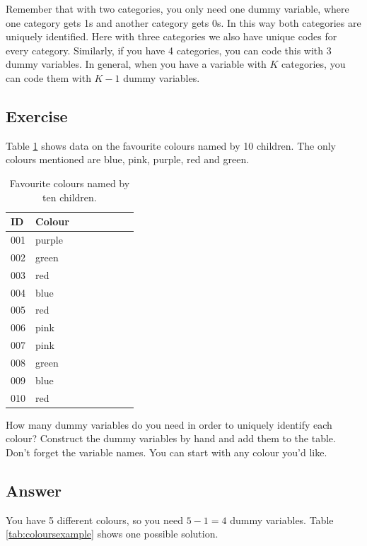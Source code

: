 \documentclass[]{report}\usepackage[]{graphicx}\usepackage[]{color}
\begin{document}
Remember that with two categories, you only need one dummy variable, where one category gets 1s and another category gets 0s. In this way both categories are uniquely identified. Here with three categories we also have unique codes for every category. Similarly, if you have 4 categories, you can code this with 3 dummy variables. In general, when you have a variable with $K$ categories, you can code them with $K-1$ dummy variables.


\subsection{Exercise}

Table \ref{tab:colours} shows data on the favourite colours named by 10 children. The only colours mentioned are blue, pink, purple, red and green. 

 \begin{table}
 \caption{Favourite colours named by ten children.}
 \begin{tabular}{llrrrrrr}
 ID & Colour &   &&&&&\\ \hline
  001 &purple & &&&&&\\
  002 &green &  &&&&&\\
  003 &red &  &&&&&\\
  004 &blue &  &&&&&\\
  005 &red &  &&&&&\\
  006 &pink &  &&&&&\\
  007 &pink &  &&&&&\\
  008 &green &  &&&&&\\
  009 &blue &  &&&&&\\
  010 &red &  &&&&&\\
 \end{tabular}
 \label{tab:colours}
 \end{table}

How many dummy variables do you need in order to uniquely identify each colour? Construct the dummy variables by hand and add them to the table. Don't forget the variable names. You can start with any colour you'd like.


\subsection{Answer}
You have 5 different colours, so you need $5-1=4$ dummy variables. Table \ref{tab:coloursexample} shows one possible solution. 
\end{document}
